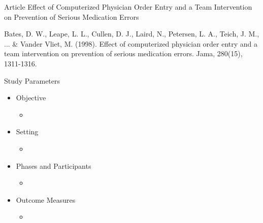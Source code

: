 \documentclass[10pt]{beamer}
\begin{document}
\begin{frame}{Article}
	\Large{Effect of Computerized Physician Order Entry and a Team Intervention on Prevention of Serious Medication Errors}
	
	
	\scriptsize{Bates, D. W., Leape, L. L., Cullen, D. J., Laird, N., Petersen, L. A., Teich, J. M., ... \& Vander Vliet, M. (1998). Effect of computerized physician order entry and a team intervention on prevention of serious medication errors. Jama, 280(15), 1311-1316.}
\end{frame}


\begin{frame}{Study Parameters}
	\begin{itemize}
		\item Objective
			\begin{itemize}
			\item 
			\end{itemize}
		\item Setting
			\begin{itemize}
			\item 
			\end{itemize}
		\item Phases and Participants
			\begin{itemize}
			\item 
			\end{itemize}
		\item Outcome Measures
			\begin{itemize}
			\item 
			\end{itemize}
	\end{itemize}
\end{frame}
\end{document}
